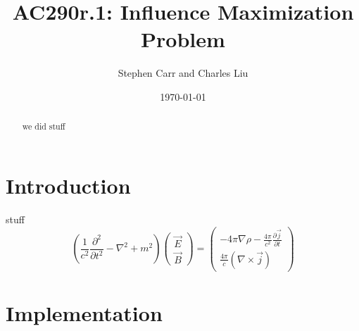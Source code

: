 \documentclass{article}
\begin{document}
	\title{AC290r.1: Influence Maximization Problem}
	\author{Stephen Carr and Charles Liu}
	\date{\today}
	\maketitle
	
	\begin{abstract}
		we did stuff
	\end{abstract}
	
	\section{Introduction}
	
	
	stuff 
	\begin{equation}
	\boxed{
		\left(\frac{1}{c^2}\frac{\partial^2}{\partial t^2} - \nabla^2 + m^2\right)
		\begin{pmatrix}
		\vec{E} \\
		\vec{B}
		\end{pmatrix}
		=
		\begin{pmatrix}
		-4\pi\nabla\rho - \frac{4\pi}{c^2}\frac{\partial\vec{j}}{\partial t} \\
		\frac{4\pi}{c}(\nabla\times\vec{j})
		\end{pmatrix}
	}
	\end{equation}
	\section{Implementation}
	
\end{document}
